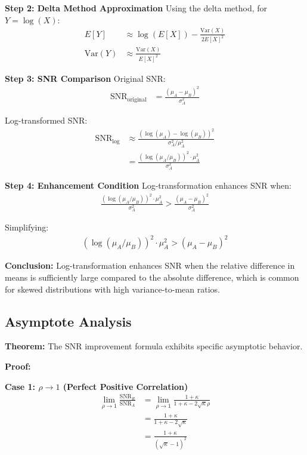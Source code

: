 \textbf{Step 2: Delta Method Approximation}
Using the delta method, for $Y = \log(X)$:
\begin{align}
E[Y] &\approx \log(E[X]) - \frac{\text{Var}(X)}{2E[X]^2} \\
\text{Var}(Y) &\approx \frac{\text{Var}(X)}{E[X]^2}
\end{align}

\textbf{Step 3: SNR Comparison}
Original SNR:
\begin{align}
\text{SNR}_{\text{original}} &= \frac{(\mu_A - \mu_B)^2}{\sigma_A^2}
\end{align}

Log-transformed SNR:
\begin{align}
\text{SNR}_{\text{log}} &\approx \frac{(\log(\mu_A) - \log(\mu_B))^2}{\sigma_A^2/\mu_A^2} \\
&= \frac{(\log(\mu_A/\mu_B))^2 \cdot \mu_A^2}{\sigma_A^2}
\end{align}

\textbf{Step 4: Enhancement Condition}
Log-transformation enhances SNR when:
\begin{align}
\frac{(\log(\mu_A/\mu_B))^2 \cdot \mu_A^2}{\sigma_A^2} > \frac{(\mu_A - \mu_B)^2}{\sigma_A^2}
\end{align}

Simplifying:
\begin{align}
(\log(\mu_A/\mu_B))^2 \cdot \mu_A^2 > (\mu_A - \mu_B)^2
\end{align}

\textbf{Conclusion:} Log-transformation enhances SNR when the relative difference in means is sufficiently large compared to the absolute difference, which is common for skewed distributions with high variance-to-mean ratios.

\subsection{Asymptote Analysis}

\textbf{Theorem:} The SNR improvement formula exhibits specific asymptotic behavior.

\textbf{Proof:}

\textbf{Case 1: $\rho \to 1$ (Perfect Positive Correlation)}
\begin{align}
\lim_{\rho \to 1} \frac{\text{SNR}_R}{\text{SNR}_A} &= \lim_{\rho \to 1} \frac{1 + \kappa}{1 + \kappa - 2\sqrt{\kappa}\rho} \\
&= \frac{1 + \kappa}{1 + \kappa - 2\sqrt{\kappa}} \\
&= \frac{1 + \kappa}{(\sqrt{\kappa} - 1)^2}
\end{align}

